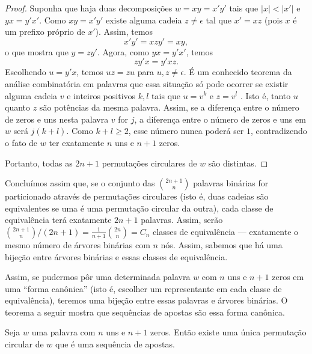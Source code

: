 \begin{proof}
    Suponha que haja duas decomposições $w = xy = x'y'$
    tais que $|x| < |x'|$ e $yx = y'x'$.
    Como $xy = x'y'$
    existe alguma cadeia $z \neq \epsilon$
    tal que $x' = xz$
    (pois $x$ é um prefixo próprio de $x'$).
    Assim, temos
    \begin{equation*}
        x'y' = xzy' = xy,
    \end{equation*}
    o que mostra que $y = zy'$.
    Agora,
    como $yx = y'x'$,
    temos
    \begin{equation*}
        zy'x = y'xz.
    \end{equation*}
    Escolhendo $u = y'x$, temos $uz = zu$
    para $u, z \neq \epsilon$.
    É um conhecido teorema da análise combinatória em palavras
    que essa situação só pode ocorrer se
    existir alguma cadeia $v$ e inteiros positivos $k, l$ tais que
    $u = v^k$ e $z = v^l$ \cite[p.~32]{Shallit2008}.
    Isto é, tanto $u$ quanto $z$ são potências da mesma palavra.
    Assim,
    se a diferença entre o número de zeros e uns nesta palavra $v$ for $j$,
    a diferença entre o número de zeros e uns em $w$ será $j(k + l)$.
    Como $k + l \geq 2$,
    esse número nunca poderá ser $1$,
    contradizendo o fato de $w$ ter exatamente $n$ uns e $n+1$ zeros.

    Portanto, todas as $2n+1$ permutações circulares de $w$ são distintas.
\end{proof}

Concluímos assim que,
se o conjunto das $\binom{2n+1}{n}$ palavras binárias
for particionado através de permutações circulares
(isto é, duas cadeias são equivalentes se uma é uma permutação circular da outra),
cada classe de equivalência terá exatamente $2n+1$ palavras.
Assim,
serão $\binom{2n+1}{n}/(2n+1) = \frac{1}{n+1} \binom{2n}{n} = C_n$
classes de equivalência
--- exatamente o mesmo número de árvores binárias com $n$ nós.
Assim,
sabemos que há uma bijeção entre árvores binárias e essas classes de equivalência.

Assim,
se pudermos pôr uma determinada palavra $w$ com $n$ uns e $n+1$ zeros
em uma ``forma canônica''
(isto é, escolher um representante em cada classe de equivalência),
teremos uma bijeção entre essas palavras e árvores binárias.
O teorema a seguir mostra que
sequências de apostas são essa forma canônica.

\begin{lemma}
    Seja $w$ uma palavra com $n$ uns e $n+1$ zeros.
    Então existe uma única permutação circular de $w$
    que é uma sequência de apostas.
\end{lemma}

